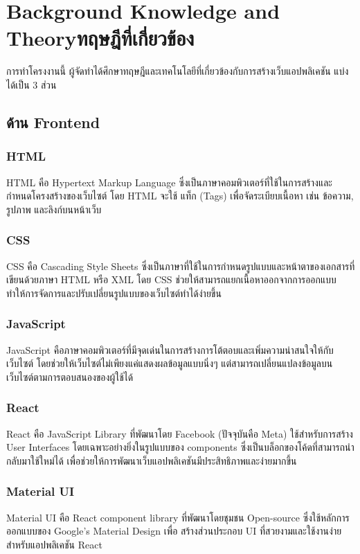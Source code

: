 \chapter{\ifenglish Background Knowledge and Theory\else ทฤษฎีที่เกี่ยวข้อง\fi}

การทำโครงงานนี้ ผู้จัดทำได้ศึกษาทฤษฎีและเทคโนโลยีที่เกี่ยวข้องกับการสร้างเว็บแอปพลิเคชัน
แบ่งได้เป็น 3 ส่วน
\section{ด้าน Frontend}
\subsection{HTML}
HTML คือ Hypertext Markup Language ซึ่งเป็นภาษาคอมพิวเตอร์ที่ใช้ในการสร้างและกำหนดโครงสร้างของเว็บไซต์ โดย HTML จะใช้ แท็ก (Tags) เพื่อจัดระเบียบเนื้อหา เช่น ข้อความ, รูปภาพ และลิงก์บนหน้าเว็บ 
\cite{html1}
\subsection{CSS}
CSS คือ Cascading Style Sheets ซึ่งเป็นภาษาที่ใช้ในการกำหนดรูปแบบและหน้าตาของเอกสารที่เขียนด้วยภาษา HTML หรือ XML โดย CSS ช่วยให้สามารถแยกเนื้อหาออกจากการออกแบบ ทำให้การจัดการและปรับเปลี่ยนรูปแบบของเว็บไซต์ทำได้ง่ายขึ้น
\cite{css1}\cite{css2}
\subsection{JavaScript}
JavaScript คือภาษาคอมพิวเตอร์ที่มีจุดเด่นในการสร้างการโต้ตอบและเพิ่มความน่าสนใจให้กับเว็บไซต์ 
โดยช่วยให้เว็บไซต์ไม่เพียงแค่แสดงผลข้อมูลแบบนิ่งๆ แต่สามารถเปลี่ยนแปลงข้อมูลบนเว็บไซต์ตามการตอบสนองของผู้ใช้ได้
\cite{javascript1}\cite{javascript2}
\subsection{React}
React คือ JavaScript Library ที่พัฒนาโดย Facebook (ปัจจุบันคือ Meta) ใช้สำหรับการสร้าง User Interfaces โดยเฉพาะอย่างยิ่งในรูปแบบของ components ซึ่งเป็นบล็อกของโค้ดที่สามารถนำกลับมาใช้ใหม่ได้
เพื่อช่วยให้การพัฒนาเว็บแอปพลิเคชันมีประสิทธิภาพและง่ายมากขึ้น\cite{react1}\cite{react2}
\subsection{Material UI}
Material UI คือ React component library ที่พัฒนาโดยชุมชน Open-source ซึ่งใช้หลักการออกแบบของ Google's Material Design เพื่อ
สร้างส่วนประกอบ UI ที่สวยงามและใช้งานง่ายสำหรับแอปพลิเคชัน React\cite{mui}\cite{mui2}
